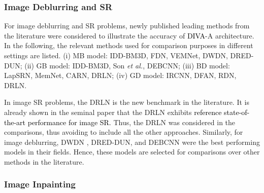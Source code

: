 \documentclass[10pt,journal,compsoc]{IEEEtran}
\newcommand{\sd}{\textcolor{black}}
\newcommand{\dk}{\textcolor{black}}
\begin{document}


\subsubsection{Image Deblurring and SR}


For image deblurring and SR problems, newly published leading methods from the literature were considered to illustrate the accuracy of \dk{DIVA}-A architecture. In the following, the relevant methods used for comparison purposes in different settings are listed.
(i) MB model: IDD-BM3D\cite{Danielyan2012bm3d}, FDN\cite{Kruse2017learning}, VEMNet\cite{Nan2020variational}, DWDN\cite{Dong2020deep}, DRED-DUN\cite{Kong2022deep};
(ii) GB model: IDD-BM3D\cite{Danielyan2012bm3d}, Son \textit{et al.}\cite{Son2017fast}, DEBCNN\cite{Wang2018training};
(iii) BD model: LapSRN\cite{Lai2017deep}, MemNet\cite{Tai2017MemNet}, CARN\cite{Ahn2018fast}, DRLN\cite{Anwar2022densely};
(iv) GD model: IRCNN\cite{Zhang2017learning}, DFAN\cite{Li2022DFAN}, RDN\cite{Zhang2021residual}, DRLN\cite{Anwar2022densely}.


In image SR problems, the DRLN \cite{Anwar2022densely} is the new benchmark in the literature. It is already shown in the seminal paper that the DRLN \cite{Anwar2022densely} exhibits \sd{reference state-of-the-art performance for image SR.}
Thus, the DRLN \cite{Anwar2022densely} was considered in the comparisons, thus avoiding to include all the other approaches. Similarly, for image deblurring, DWDN \cite{Dong2020deep}, DRED-DUN\cite{Kong2022deep}, and DEBCNN\cite{Wang2018training} were the best performing models in their fields. Hence, these models are selected for comparisons over other methods in the literature.



\subsubsection{Image Inpainting}
\end{document}
